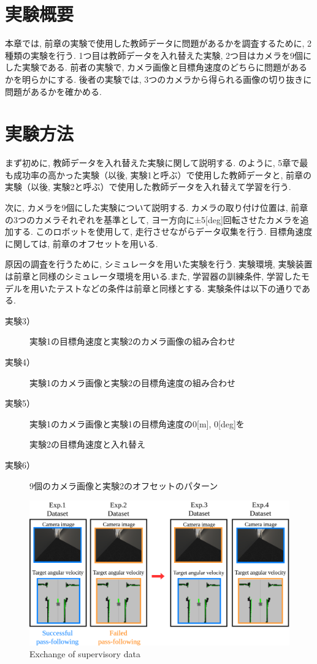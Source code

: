 
\section{実験概要}
本章では, 前章の実験で使用した教師データに問題があるかを調査するために, 2種類の実験を行う. 1つ目は教師データを入れ替えた実験, 2つ目はカメラを9個にした実験である. 前者の実験で, カメラ画像と目標角速度のどちらに問題があるかを明らかにする. 後者の実験では, 3つのカメラから得られる画像の切り抜きに問題があるかを確かめる. 

\section{実験方法}
まず初めに, 教師データを入れ替えた実験に関して説明する. のように, 5章で最も成功率の高かった実験（以後, 実験1と呼ぶ）で使用した教師データと, 前章の実験（以後, 実験2と呼ぶ）で使用した教師データを入れ替えて学習を行う.
\par 次に, カメラを9個にした実験について説明する. カメラの取り付け位置は, 前章の3つのカメラそれぞれを基準として, ヨー方向に±5[deg]回転させたカメラを追加する. このロボットを使用して, 走行させながらデータ収集を行う. 目標角速度に関しては, 前章のオフセットを用いる. 
\par 原因の調査を行うために, シミュレータを用いた実験を行う. 実験環境, 実験装置は前章と同様のシミュレータ環境を用いる.また, 学習器の訓練条件, 学習したモデルを用いたテストなどの条件は前章と同様とする. 実験条件は以下の通りである. 

\begin{description}
  \item[実験3）] 実験1の目標角速度と実験2のカメラ画像の組み合わせ
  \item[実験4）] 実験1のカメラ画像と実験2の目標角速度の組み合わせ
  \item[実験5）] 実験1のカメラ画像と実験1の目標角速度の0[m], 0[deg]を\par \hspace*{6mm}実験2の目標角速度と入れ替え
  \item[実験6）] 9個のカメラ画像と実験2のオフセットのパターン
\end{description}

\begin{figure}[h]
  \centering
  \includegraphics[keepaspectratio, scale=0.22]{images/change.png}
  \caption{Exchange of supervisory data}
  \label{Fig:change}
\end{figure}

